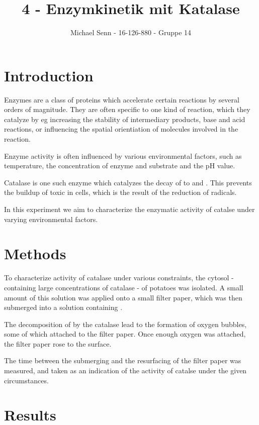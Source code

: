 \documentclass[a4paper,english]{scrreprt}
\title{4 - Enzymkinetik mit Katalase}
\author{Michael Senn \maillink{michael.senn@students.unibe.ch} - 16-126-880 - Gruppe 14}
\date{\printdate}
\begin{document}
\maketitle

\chapter{Introduction}

Enzymes are a class of proteins which accelerate certain reactions by several
orders of magnitude. They are often specific to one kind of reaction, which
they catalyze by eg increasing the stability of intermediary products, base and
acid reactions, or influencing the spatial orientiation of molecules involved
in the reaction.

Enzyme activity is often influenced by various environmental factors, such as
temperature, the concentration of enzyme and substrate and the pH value.

Catalase is one such enzyme which catalyzes the decay of  to 
and . This prevents the buildup of toxic  in cells, which is
the result of the reduction of  radicals.

In this experiment we aim to characterize the enzymatic activity of catalse
under varying environmental factors.

\chapter{Methods}

To characterize activity of catalase under various constraints, the cytosol -
containing large concentrations of catalase - of potatoes was isolated. A small
amount of this solution was applied onto a small filter paper, which was then
submerged into a solution containing .

The decomposition of  by the catalase lead to the formation of oxygen
bubbles, some of which attached to the filter paper. Once enough oxygen was
attached, the filter paper rose to the surface.

The time between the submerging and the resurfacing of the filter paper was
measured, and taken as an indication of the activity of catalse under the given
circumstances.

\chapter{Results}
\end{document}
